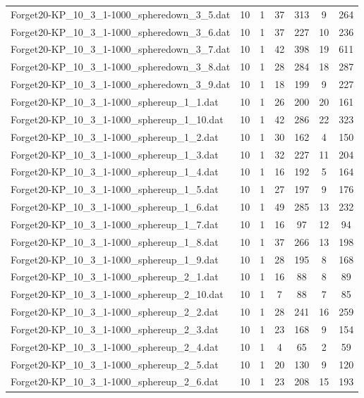 \begin{table}[!ht]
\begin{tabular}{lcccccc}
Forget20-KP\_10\_3\_1-1000\_spheredown\_3\_5.dat & 10 & 1 & 37 & 313 & 9 & 264 \\
Forget20-KP\_10\_3\_1-1000\_spheredown\_3\_6.dat & 10 & 1 & 37 & 227 & 10 & 236 \\
Forget20-KP\_10\_3\_1-1000\_spheredown\_3\_7.dat & 10 & 1 & 42 & 398 & 19 & 611 \\
Forget20-KP\_10\_3\_1-1000\_spheredown\_3\_8.dat & 10 & 1 & 28 & 284 & 18 & 287 \\
Forget20-KP\_10\_3\_1-1000\_spheredown\_3\_9.dat & 10 & 1 & 18 & 199 & 9 & 227 \\
Forget20-KP\_10\_3\_1-1000\_sphereup\_1\_1.dat & 10 & 1 & 26 & 200 & 20 & 161 \\
Forget20-KP\_10\_3\_1-1000\_sphereup\_1\_10.dat & 10 & 1 & 42 & 286 & 22 & 323 \\
Forget20-KP\_10\_3\_1-1000\_sphereup\_1\_2.dat & 10 & 1 & 30 & 162 & 4 & 150 \\
Forget20-KP\_10\_3\_1-1000\_sphereup\_1\_3.dat & 10 & 1 & 32 & 227 & 11 & 204 \\
Forget20-KP\_10\_3\_1-1000\_sphereup\_1\_4.dat & 10 & 1 & 16 & 192 & 5 & 164 \\
Forget20-KP\_10\_3\_1-1000\_sphereup\_1\_5.dat & 10 & 1 & 27 & 197 & 9 & 176 \\
Forget20-KP\_10\_3\_1-1000\_sphereup\_1\_6.dat & 10 & 1 & 49 & 285 & 13 & 232 \\
Forget20-KP\_10\_3\_1-1000\_sphereup\_1\_7.dat & 10 & 1 & 16 & 97 & 12 & 94 \\
Forget20-KP\_10\_3\_1-1000\_sphereup\_1\_8.dat & 10 & 1 & 37 & 266 & 13 & 198 \\
Forget20-KP\_10\_3\_1-1000\_sphereup\_1\_9.dat & 10 & 1 & 28 & 195 & 8 & 168 \\
Forget20-KP\_10\_3\_1-1000\_sphereup\_2\_1.dat & 10 & 1 & 16 & 88 & 8 & 89 \\
Forget20-KP\_10\_3\_1-1000\_sphereup\_2\_10.dat & 10 & 1 & 7 & 88 & 7 & 85 \\
Forget20-KP\_10\_3\_1-1000\_sphereup\_2\_2.dat & 10 & 1 & 28 & 241 & 16 & 259 \\
Forget20-KP\_10\_3\_1-1000\_sphereup\_2\_3.dat & 10 & 1 & 23 & 168 & 9 & 154 \\
Forget20-KP\_10\_3\_1-1000\_sphereup\_2\_4.dat & 10 & 1 & 4 & 65 & 2 & 59 \\
Forget20-KP\_10\_3\_1-1000\_sphereup\_2\_5.dat & 10 & 1 & 20 & 130 & 9 & 120 \\
Forget20-KP\_10\_3\_1-1000\_sphereup\_2\_6.dat & 10 & 1 & 23 & 208 & 15 & 193 \\

\end{tabular}
\end{table}
